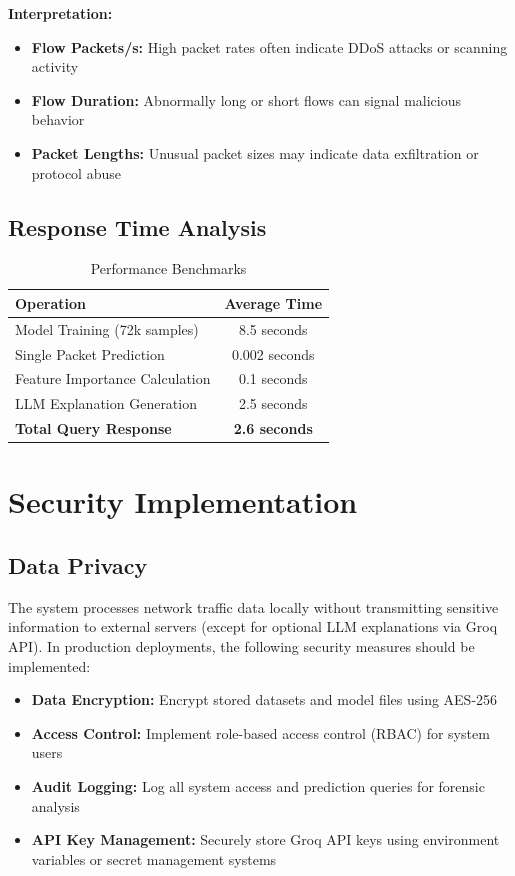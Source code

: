 \documentclass[12pt,a4paper]{article}
\begin{document}
\textbf{Interpretation:}
\begin{itemize}
    \item \textbf{Flow Packets/s:} High packet rates often indicate DDoS attacks or scanning activity
    \item \textbf{Flow Duration:} Abnormally long or short flows can signal malicious behavior
    \item \textbf{Packet Lengths:} Unusual packet sizes may indicate data exfiltration or protocol abuse
\end{itemize}

\subsection{Response Time Analysis}

\begin{table}[H]
\centering
\begin{tabular}{|l|c|}
\hline
\textbf{Operation} & \textbf{Average Time} \\
\hline
Model Training (72k samples) & 8.5 seconds \\
Single Packet Prediction & 0.002 seconds \\
Feature Importance Calculation & 0.1 seconds \\
LLM Explanation Generation & 2.5 seconds \\
\hline
\textbf{Total Query Response} & \textbf{2.6 seconds} \\
\hline
\end{tabular}
\caption{Performance Benchmarks}
\end{table}

\section{Security Implementation}

\subsection{Data Privacy}

The system processes network traffic data locally without transmitting sensitive information to external servers (except for optional LLM explanations via Groq API). In production deployments, the following security measures should be implemented:

\begin{itemize}
    \item \textbf{Data Encryption:} Encrypt stored datasets and model files using AES-256
    \item \textbf{Access Control:} Implement role-based access control (RBAC) for system users
    \item \textbf{Audit Logging:} Log all system access and prediction queries for forensic analysis
    \item \textbf{API Key Management:} Securely store Groq API keys using environment variables or secret management systems
\end{itemize}
\end{document}
